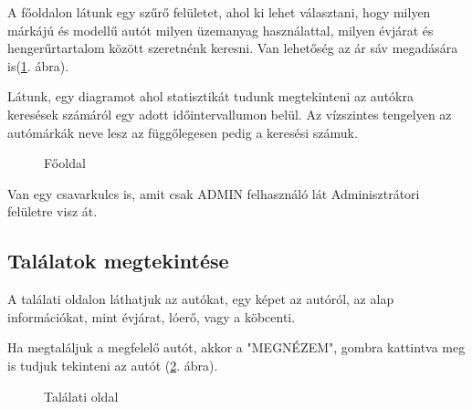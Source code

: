 A főoldalon látunk egy szűrő felületet, ahol ki lehet választani, hogy milyen márkájú és modellű autót milyen üzemanyag használattal, milyen évjárat és hengerűrtartalom között szeretnénk keresni. Van lehetőség az ár sáv megadására is(\ref{fig:Fooldal}. ábra).

Látunk, egy diagramot ahol statisztikát tudunk megtekinteni az autókra keresések számáról egy adott időintervallumon belül. Az vízszintes tengelyen az autómárkák neve lesz az függőlegesen pedig a keresési számuk.

\begin{figure}[h]
\centering
{}
\caption{Főoldal}
\label{fig:Fooldal}
\end{figure}

Van egy csavarkulcs is, amit csak ADMIN felhasználó lát Adminisztrátori felületre visz át.

\subsection{Találatok megtekintése}

A találati oldalon láthatjuk az autókat, egy képet az autóról, az alap információkat, mint évjárat, lóerő, vagy a köbcenti.

Ha megtaláljuk a megfelelő autót, akkor a "MEGNÉZEM", gombra kattintva meg is tudjuk tekinteni az autót (\ref{fig:Talalatok}. ábra).
\newpage

\begin{figure}[h]
\centering
{}
\caption{Találati oldal}
\label{fig:Talalatok}
\end{figure}

